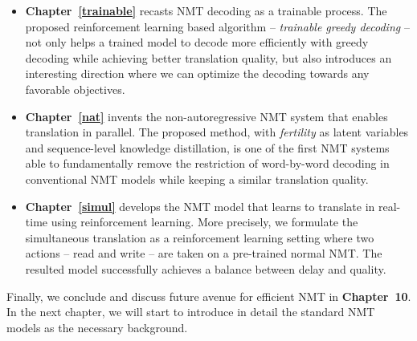 \begin{itemize}
\item \textbf{Chapter~\ref{trainable}} recasts NMT decoding as a trainable process. The proposed reinforcement learning based algorithm -- {\it trainable greedy decoding} -- not only helps a trained model to decode more efficiently with greedy decoding while achieving better translation quality, but also introduces an interesting direction where we can optimize the decoding towards any favorable objectives.
\item \textbf{Chapter~\ref{nat}} invents the non-autoregressive NMT system that enables translation in parallel. The proposed method, with {\it fertility} as latent variables and sequence-level knowledge distillation, is one of the first NMT systems able to fundamentally remove the restriction of word-by-word decoding in conventional NMT models while keeping a similar translation quality.
\item \textbf{Chapter~\ref{simul}} develops the NMT model that learns to translate in real-time using reinforcement learning. More precisely, we formulate the simultaneous translation as a reinforcement learning setting where two actions -- read and write -- are taken on a pre-trained normal NMT.  The resulted model successfully achieves a balance between delay and quality. 
\end{itemize}
Finally, we conclude and discuss future avenue for efficient NMT in \textbf{Chapter~10}.	 In the next chapter, we will start to introduce in detail the standard NMT models as the necessary background.
